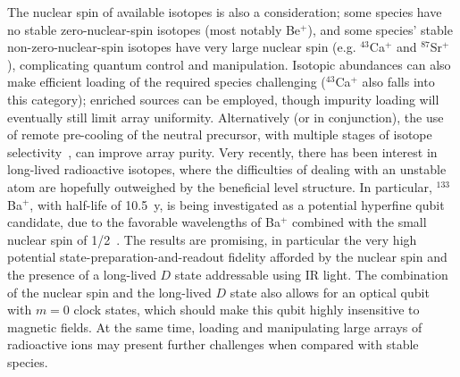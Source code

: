 \documentclass[%
reprint,
 amsmath,amssymb,
]{revtex4-1}
\begin{document}
The nuclear spin of available isotopes is also a consideration; some species have no stable zero-nuclear-spin isotopes (most notably Be$^{+}$), and some species' stable non-zero-nuclear-spin isotopes have very large nuclear spin (e.g. $^{43}$Ca$^{+}$ and $^{87}$Sr$^{+}$), complicating quantum control and manipulation.  Isotopic abundances can also make efficient loading of the required species challenging ($^{43}$Ca$^{+}$ also falls into this category); enriched sources can be employed, though impurity loading will eventually still limit array uniformity.  Alternatively (or in conjunction), the use of remote pre-cooling of the neutral precursor, with multiple stages of isotope selectivity~\cite{sage2012loading,BruzewiczArrayLoading2016}, can improve array purity.  Very recently, there has been interest in long-lived radioactive isotopes, where the difficulties of dealing with an unstable atom are hopefully outweighed by the beneficial level structure.  In particular, $^{133}$Ba$^{+}$, with half-life of 10.5~y, is being investigated as a potential hyperfine qubit candidate, due to the favorable wavelengths of Ba$^{+}$ combined with the small nuclear spin of 1/2~\cite{PhysRevLett.119.100501}.  The results are promising, in particular the very high potential state-preparation-and-readout fidelity afforded by the nuclear spin and the presence of a long-lived $D$ state addressable using IR light. The combination of the nuclear spin and the long-lived $D$ state also allows for an optical qubit with $m=0$ clock states, which should make this qubit highly insensitive to magnetic fields.  At the same time, loading and manipulating large arrays of radioactive ions may present further challenges when compared with stable species.
\end{document}
